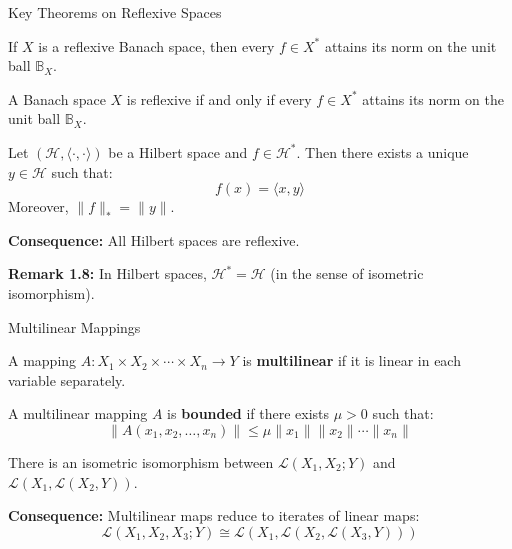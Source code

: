 \documentclass[aspectratio=169,10pt]{beamer}
\begin{document}
\begin{frame}{Key Theorems on Reflexive Spaces}
  \begin{theorem}
    If $X$ is a reflexive Banach space, then every $f \in X^*$ attains its norm on the unit ball $\mathbb{B}_X$.
  \end{theorem}

  \vspace{0.3cm}
  \begin{theorem}[Theorem 1.22]
    A Banach space $X$ is reflexive if and only if every $f \in X^*$ attains its norm on the unit ball $\mathbb{B}_X$.
  \end{theorem}

  \vspace{0.3cm}
  \begin{theorem}
    Let $(\mathcal{H}, \langle \cdot, \cdot \rangle)$ be a Hilbert space and $f \in \mathcal{H}^*$. Then there exists a unique $y \in \mathcal{H}$ such that:
    $$f(x) = \langle x, y \rangle$$
    Moreover, $\|f\|_* = \|y\|$.
  \end{theorem}

  \vspace{0.3cm}
  \textbf{Consequence:} All Hilbert spaces are reflexive.

  \vspace{0.2cm}
  \textbf{Remark 1.8:} In Hilbert spaces, $\mathcal{H}^* = \mathcal{H}$ (in the sense of isometric isomorphism).
\end{frame}

\begin{frame}{Multilinear Mappings}
  \begin{definition}
    A mapping $A : X_1 \times X_2 \times \cdots \times X_n \to Y$ is \textbf{multilinear} if it is linear in each variable separately.
  \end{definition}

  \vspace{0.3cm}
  \begin{definition}
    A multilinear mapping $A$ is \textbf{bounded} if there exists $\mu > 0$ such that:
    $$\|A(x_1, x_2, \ldots, x_n)\| \leq \mu \|x_1\| \|x_2\| \cdots \|x_n\|$$
  \end{definition}

  \vspace{0.3cm}
  \begin{theorem}[Theorem 1.20]
    There is an isometric isomorphism between $\mathcal{L}(X_1, X_2; Y)$ and $\mathcal{L}(X_1, \mathcal{L}(X_2, Y))$.
  \end{theorem}

  \vspace{0.3cm}
  \textbf{Consequence:} Multilinear maps reduce to iterates of linear maps:
  $$\mathcal{L}(X_1, X_2, X_3; Y) \cong \mathcal{L}(X_1, \mathcal{L}(X_2, \mathcal{L}(X_3, Y)))$$
\end{frame}
\end{document}
